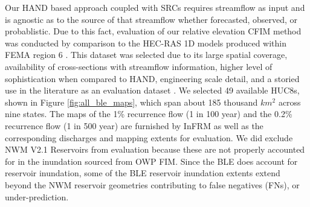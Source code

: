 \documentclass[draft]{dependencies/agujournal2019}
\begin{document}
Our HAND based approach coupled with SRCs requires streamflow as input and is agnostic as to the source of that streamflow whether forecasted, observed, or probablistic.
Due to this fact, evaluation of our relative elevation CFIM method was conducted by comparison to the HEC-RAS 1D models produced within FEMA region 6 \cite{fema2021base,fema2021estimated,us2022hydrologic}.
This dataset was selected due to its large spatial coverage, availability of cross-sections with streamflow information, higher level of sophistication when compared to HAND, engineering scale detail, and a storied use in the literature as an evaluation dataset \cite{cook2009effect,rajib2016large,zheng2018geoflood,afshari2018comparison,wing2017validation,criss2022stage,follum2017autorapid,bates201630m,wing2017validation,hu2021real,li2022accounting,li2022comprehensive,zheng2018geoflood}.
We selected 49 available HUC8s, shown in Figure \ref{fig:all_ble_maps}, which span about 185 thousand $km^2$ across nine states.
The maps of the 1\% recurrence flow (1 in 100 year) and the 0.2\% recurrence flow (1 in 500 year) are furnished by InFRM as well as the corresponding discharges and mapping extents for evaluation.
We did exclude NWM V2.1 Reservoirs from evaluation because these are not properly accounted for in the inundation sourced from OWP FIM.
Since the BLE does account for reservoir inundation, some of the BLE reservoir inundation extents extend beyond the NWM reservoir geometries contributing to false negatives (FNs), or under-prediction.
\end{document}
